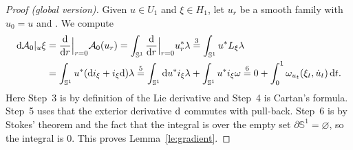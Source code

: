 \documentclass[pdftex]{sigma}
\numberwithin{equation}{section}
\renewcommand{\SS}{{\mathbb{S}}}
\newcommand{\Aa}{{\mathcal{A}}} %
\newcommand{\p}{{\partial}}
\newcommand{\1}{{{\mathchoice {\rm 1\mskip-4mu l} {\rm 1\mskip-4mu l}
{\rm 1\mskip-4.5mu l} {\rm 1\mskip-5mu l}}}}
\begin{document}
\begin{proof}[Proof (global version)]
Given $u\in U_1$ and $\xi\in H_1$,
let $u_r$ be a smooth family with $u_0=u$ and
. We compute
\begin{align*}
 {\rm d}\Aa_0|_u\xi
 &=\frac{{\rm d}}{{\rm d}r}\Big|_{r=0}\Aa_0(u_r)
 =\int_{\SS^1}\frac{{\rm d}}{{\rm d}r}\Big|_{r=0} u_r^*\lambda
 \stackrel{3}{=}\int_{\SS^1} u^* L_\xi\lambda\\
 &=\int_{\SS^1} u^* ({\rm d}{i}_\xi+i_\xi {\rm d})\lambda
 \stackrel{5}{=}\int_{\SS^1} {\rm d}u^*i_\xi\lambda +\int_{\SS^1} u^*i_\xi \omega
 \stackrel{6}{=} 0+\int_0^1\omega_{u_t}(\xi_t,\dot u_t)\, {\rm d}t .
\end{align*}
Here Step~3 is by definition of the Lie derivative
and Step~4 is Cartan's formula.
Step~5 uses that the exterior derivative ${\rm d}$ commutes with pull-back.
Step~6 is by Stokes' theorem and the fact that the integral is over the
empty set $\p\SS^1=\varnothing$, so the integral is $0$.
This proves Lemma~\ref{le:gradient}.
\end{proof}
\end{document}
